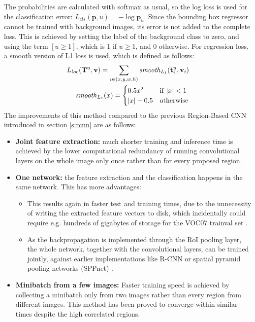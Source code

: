 The probabilities are calculated with softmax as usual, so the log loss is used for the classification error: $L_{cls}(\mathbf{p},u) = -\log \mathbf{p}_u$. Since the bounding box regressor cannot be trained with background images, its error is not added to the complete loss. This is achieved by setting the label of the background class to zero, and using the term $[u \ge 1]$, which is 1 if $u \ge 1$, and 0 otherwise. For regression loss, a smooth version of L1 loss is used, which is defined as follows:
\bigbreak
\begin{align}\label{eq:smoothl1loss}
	L_{loc}(\mathbf{T}^u, \mathbf{v}) = \sum\limits_{i \in (x, y, w, h)} \mathit{smooth}_{L_{1}} (\mathbf{t}_{i}^u, \mathbf{v}_i)\\
	\mathit{smooth}_{L_{1}} (x) = \begin{cases}
               0.5 x^2 & \text{if } \lvert x\rvert < 1\\
               \lvert x\rvert-0.5 & \text{otherwise}
            \end{cases}
\end{align}
\bigbreak
The improvements of this method compared to the previous Region-Based CNN introduced in section \ref{s:rcnn} are as follows:
\begin{itemize}
	\item\textbf{Joint feature extraction:} much shorter training and inference time is achieved by the lower computational redundancy of running convolutional layers on the whole image only once rather than for every proposed region.
	\item\textbf{One network:} the feature extraction and the classification happens in the same network. This has more advantages:
	\begin{itemize}
	        \item This results again in faster test and training times, due to the unnecessity of writing the extracted feature vectors to disk, which incidentally could require e.g. hundreds of gigabytes of storage \cite{Girshick:2016:RCN:2881668.2882239} for the VOC07 trainval set \cite{pascal-voc-2007}.
	        \item As the backpropagation is implemented through the RoI pooling layer, the whole network, together with the convolutional layers, can be trained jointly, against earlier implementations like R-CNN \cite{DBLP:journals/corr/GirshickDDM13} or spatial pyramid pooling networks (SPPnet) \cite{DBLP:journals/corr/HeZR014}.
	\end{itemize}
	\item\textbf{Minibatch from a few images:} Faster training speed is achieved by collecting a minibatch only from two images rather than every region from different images. This method has been proved to converge within similar times despite the high correlated regions.
\end{itemize}
